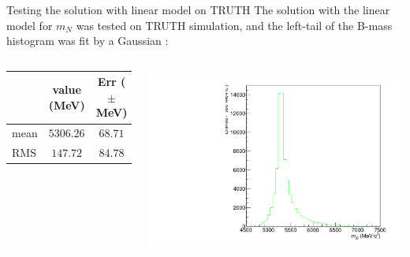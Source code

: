 \documentclass[9pt,usenames,dvipsnames]{beamer}
\begin{document}
\begin{frame}{Testing the solution with linear model on TRUTH}
	The solution with the linear model for $m_N$ was tested on TRUTH simulation, and the left-tail of the B-mass histogram was fit by a Gaussian :
	\begin{columns}[c]
		\begin{table}
			\centering
			\begin{tabular}{l  c c }
				\hline
				& value (MeV) & Err ($\pm$ MeV) \\
				\hline
				mean & $5306.26$  & $68.71$  \\
				RMS & $147.72$ & $84.78$ \\
				\hline
			\end{tabular}		
		\end{table}
		\begin{center}
			\includegraphics[width= \textwidth]{./assets/linear_model_3pimu} 
		\end{center}
	\end{columns}
\end{frame}
\end{document}
